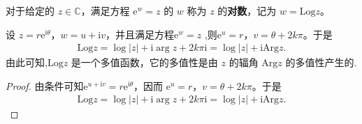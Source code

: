 \documentclass[../../main.tex]{subfiles}
\begin{document}
\begin{definition}
对于给定的 \( z \in \mathbb{C} \)，满足方程 \( \mathrm{e}^w = z \) 的 \( w \) 称为 \( z \) 的\textbf{对数}，记为 \( w = \mathrm{Log} z \)。
\end{definition}

\begin{proposition}
设 \( z = r\mathrm{e}^{\mathrm{i}\theta} \)，\( w = u + \mathrm{i}v \)，并且满足方程\( \mathrm{e}^w = z \) ,则\( \mathrm{e}^u = r \)，\( v = \theta + 2k\pi \)。于是
\begin{align*}
\mathrm{Log} z = \log|z| + \mathrm{i}\arg z + 2k\pi\mathrm{i} = \log|z| + \mathrm{i}\mathrm{Arg} z.
\end{align*}
由此可知,\( \mathrm{Log} z \) 是一个多值函数，它的多值性是由 \( z \) 的辐角 \( \mathrm{Arg} z \) 的多值性产生的.
\end{proposition}
\begin{proof}
由条件可知\( \mathrm{e}^{u + \mathrm{i}v} = r\mathrm{e}^{\mathrm{i}\theta} \)，因而 \( \mathrm{e}^u = r \)，\( v = \theta + 2k\pi \)。于是
\begin{align*}
\mathrm{Log} z = \log|z| + \mathrm{i}\arg z + 2k\pi\mathrm{i} = \log|z| + \mathrm{i}\mathrm{Arg} z.
\end{align*}

\end{proof}
\end{document}
